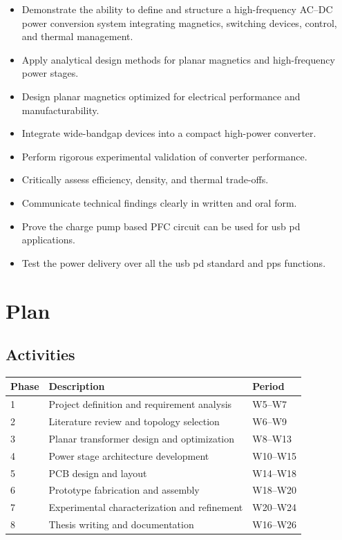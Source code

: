 \documentclass[12pt,a4paper]{report}
\begin{document}
\begin{itemize}
    \item Demonstrate the ability to define and structure a high-frequency AC--DC power conversion system integrating magnetics, switching devices, control, and thermal management.
    \item Apply analytical design methods for planar magnetics and high-frequency power stages.
    \item Design planar magnetics optimized for electrical performance and manufacturability.
    \item Integrate wide-bandgap devices into a compact high-power converter.
    \item Perform rigorous experimental validation of converter performance.
    \item Critically assess efficiency, density, and thermal trade-offs.
    \item Communicate technical findings clearly in written and oral form.
    \item Prove the charge pump based PFC circuit can be used for usb pd applications. 
    \item Test the power delivery over all the usb pd standard and pps functions. 
\end{itemize}

\chapter{Plan}

\section{Activities}

\begin{table}[h]
\centering
\begin{tabular}{lll}
\toprule
Phase & Description & Period \\
\midrule
1 & Project definition and requirement analysis & W5--W7 \\
2 & Literature review and topology selection & W6--W9 \\
3 & Planar transformer design and optimization & W8--W13 \\
4 & Power stage architecture development & W10--W15 \\
5 & PCB design and layout & W14--W18 \\
6 & Prototype fabrication and assembly & W18--W20 \\
7 & Experimental characterization and refinement & W20--W24 \\
8 & Thesis writing and documentation & W16--W26 \\
\bottomrule
\end{tabular}
\end{table}
\end{document}
